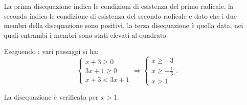 \begin{exrig}
\begin{esempio}
La prima disequazione indica le condizioni di esistenza del primo radicale, la seconda indica le condizione di esistenza del secondo radicale e dato che i due membri della disequazione sono positivi, la terza disequazione è quella data, nei quali entrambi i membri sono stati elevati al quadrato.

Eseguendo i vari passaggi si ha: \[\left\{\begin{array}{l}x+3\ge 0\\3x+1\ge 0\\x+3<3x+1\end{array}\right.\Rightarrow \left\{\begin{array}{l}x\ge -3\\x\ge -\frac 1 3\\x>1 \end{array}\right..\]

\begin{center}
 
\end{center}

La disequazione è verificata per $ x>1 $.
\end{esempio}
\end{exrig}

\ovalbox{\risolvii \ref{ese:8.18}, \ref{ese:8.19}, \ref{ese:8.20}, \ref{ese:8.21}, \ref{ese:8.22}, \ref{ese:8.23}, \ref{ese:8.24}}

\newpage

\cleardoublepage
